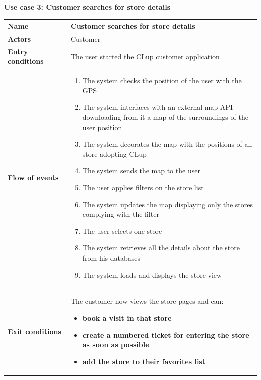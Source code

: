 \clearpage
\textbf{Use case 3: Customer searches for store details}
\smallskip
{}
\begin{longtable}{p{0.25\linewidth}p{0.75\linewidth}}
    \toprule
    \textbf{Name}                             & \textbf{Customer searches for store details}      \\
    \midrule
    \textbf{Actors}                           & Customer                                          \\
    \midrule
    \textbf{Entry conditions}                 & The user started the CLup customer application    \\
    \midrule
    \textbf{Flow of events}                   &
    \begin{enumerate}
        \item The system checks the position of the user with the GPS
        \item The system interfaces with an external map API downloading from it a map of the surroundings of the user position
        \item The system decorates the map with the positions of all store adopting CLup
        \item The system sends the map to the user
        \item The user applies filters on the store list
        \item The system updates the map displaying only the stores complying with the filter
        \item The user selects one store
        \item The system retrieves all the details about the store from his databases
        \item The system loads and displays the store view
    \end{enumerate}                                                                     \\
    \midrule
    \textbf{Exit conditions}                  & The customer now views the store pages and can:
    \begin{itemize}
        \item \textbf{book a visit in that store}
        \item \textbf{create a numbered ticket for entering the store as soon as possible}
        \item \textbf{add the store to their favorites list}
    \end{itemize}                                                                    \\

\end{longtable}
